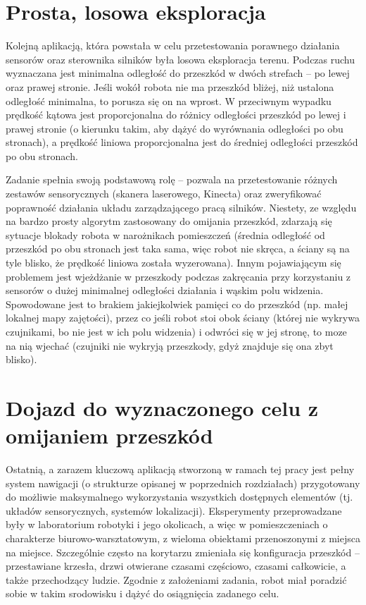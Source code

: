 \section{Prosta, losowa eksploracja}

Kolejną aplikacją, która powstała w celu przetestowania porawnego działania
sensorów oraz sterownika silników była losowa eksploracja terenu. Podczas
ruchu wyznaczana jest minimalna odległość do przeszkód w dwóch strefach
-- po lewej oraz prawej stronie. Jeśli wokół robota nie ma przeszkód bliżej,
niż ustalona odległość minimalna, to porusza się on na wprost. W przeciwnym
wypadku prędkość kątowa jest proporcjonalna do różnicy odległości przeszkód
po lewej i prawej stronie (o kierunku takim, aby dążyć do wyrównania odległości
po obu stronach), a prędkość liniowa proporcjonalna jest do średniej odległości
przeszkód po obu stronach.

Zadanie spełnia swoją podstawową rolę -- pozwala na przetestowanie różnych
zestawów sensorycznych (skanera laserowego, Kinecta) oraz zweryfikować
poprawność działania układu zarządzającego pracą silników. Niestety, ze względu
na bardzo prosty algorytm zastosowany do omijania przeszkód, zdarzają się sytuacje
blokady robota w narożnikach pomieszczeń (średnia odległość od przeszkód po
obu stronach jest taka sama, więc robot nie skręca, a ściany są na tyle blisko,
że prędkość liniowa została wyzerowana). Innym pojawiającym się problemem
jest wjeżdżanie w przeszkody podczas zakręcania przy korzystaniu z sensorów
o dużej minimalnej odległości działania i wąskim polu widzenia. Spowodowane jest
to brakiem jakiejkolwiek pamięci co do przeszkód (np. małej lokalnej mapy zajętości),
przez co jeśli robot stoi obok ściany (której nie wykrywa czujnikami, bo nie jest
w ich polu widzenia) i odwróci się w jej stronę, to moze na nią wjechać (czujniki
nie wykryją przeszkody, gdyż znajduje się ona zbyt blisko).






\section{Dojazd do wyznaczonego celu z omijaniem przeszkód}

Ostatnią, a zarazem kluczową aplikacją stworzoną w ramach tej pracy jest
pełny system nawigacji (o strukturze opisanej w poprzednich rozdziałach)
przygotowany do możliwie maksymalnego wykorzystania wszystkich dostępnych
elementów (tj. układów sensorycznych, systemów lokalizacji). Eksperymenty
przeprowadzane były w laboratorium robotyki i jego okolicach, a więc w pomieszczeniach
o charakterze biurowo-warsztatowym, z wieloma obiektami przenoszonymi z miejsca
na miejsce. Szczególnie często na korytarzu zmieniała się konfiguracja przeszkód
-- przestawiane krzesła, drzwi otwierane czasami częściowo, czasami całkowicie,
a także przechodzący ludzie. Zgodnie z założeniami zadania, robot miał poradzić
sobie w takim srodowisku i dążyć do osiągnięcia zadanego celu.

